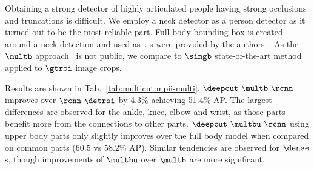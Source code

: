 Obtaining a strong detector of highly articulated people having strong
occlusions and truncations is difficult. We employ a neck detector as
a person detector as it turned out to be the most reliable part.
Full body bounding box is created around a neck detection and used as~\detroi.
\gtroi s were provided by the authors~\cite{andriluka14cvpr}.
As the $\multb$ approach~\cite{Chen:2015:POC} is not public, we
compare to $\singb$ state-of-the-art method~\cite{chen14nips} applied
to $\gtroi$ image crops.

Results are shown in
Tab.~\ref{tab:multicut:mpii-multi}. 
$\deepcut~\multb~\rcnn$ improves over $\rcnn~\detroi$ by 4.3\%
achieving 51.4\% AP. The largest differences are observed for the
ankle, knee, elbow and wrist, as those parts benefit more from the
connections to other parts. 
$\deepcut~\multbu~\rcnn$ using upper body parts only slightly improves
over the full body model when compared on common parts (60.5 vs 58.2\%
AP). Similar tendencies are observed for $\dense$s, though improvements
of $\multbu$ over $\multb$ are more significant.

